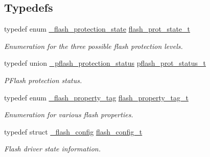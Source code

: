 \subsection*{Typedefs}
\begin{DoxyCompactItemize}
\item 
\mbox{\label{group__ftfx__flash__driver_ga803f9a1815977c4e0a9a9e3f37e069c4}} 
typedef enum \mbox{\hyperlink{group__ftfx__flash__driver_gaa57200417aa53aa9cd19535f69b5c964}{\+\_\+flash\+\_\+protection\+\_\+state}} \mbox{\hyperlink{group__ftfx__flash__driver_ga803f9a1815977c4e0a9a9e3f37e069c4}{flash\+\_\+prot\+\_\+state\+\_\+t}}
\begin{DoxyCompactList}\small\item\em Enumeration for the three possible flash protection levels. \end{DoxyCompactList}\item 
\mbox{\label{group__ftfx__flash__driver_ga8442f40cafd588044b2b4c00ec2661ed}} 
typedef union \mbox{\hyperlink{union__pflash__protection__status}{\+\_\+pflash\+\_\+protection\+\_\+status}} \mbox{\hyperlink{group__ftfx__flash__driver_ga8442f40cafd588044b2b4c00ec2661ed}{pflash\+\_\+prot\+\_\+status\+\_\+t}}
\begin{DoxyCompactList}\small\item\em P\+Flash protection status. \end{DoxyCompactList}\item 
\mbox{\label{group__ftfx__flash__driver_gaded074dd3bc89c29d97e51089902698a}} 
typedef enum \mbox{\hyperlink{group__ftfx__flash__driver_gab58c8e11c7236162806360885b462391}{\+\_\+flash\+\_\+property\+\_\+tag}} \mbox{\hyperlink{group__ftfx__flash__driver_gaded074dd3bc89c29d97e51089902698a}{flash\+\_\+property\+\_\+tag\+\_\+t}}
\begin{DoxyCompactList}\small\item\em Enumeration for various flash properties. \end{DoxyCompactList}\item 
typedef struct \mbox{\hyperlink{struct__flash__config}{\+\_\+flash\+\_\+config}} \mbox{\hyperlink{group__ftfx__flash__driver_ga0dfc969e6f9e17c17e60d823565141a5}{flash\+\_\+config\+\_\+t}}
\begin{DoxyCompactList}\small\item\em Flash driver state information. \end{DoxyCompactList}\end{DoxyCompactItemize}
